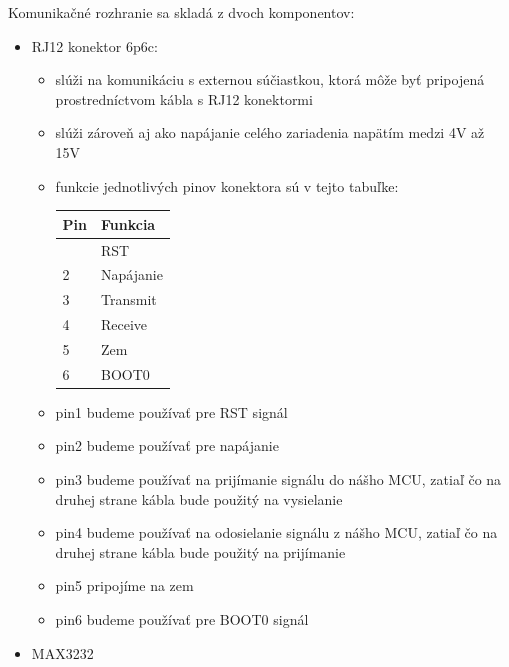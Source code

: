 \documentclass[12pt, twoside]{book}
\begin{document}
Komunikačné rozhranie sa skladá z dvoch komponentov:
\begin{itemize}
\item 
  RJ12 konektor 6p6c:
  \begin{itemize}
   \item 
  slúži na komunikáciu s externou súčiastkou, ktorá môže byť pripojená prostredníctvom kábla s RJ12 konektormi
  \item 
  slúži zároveň aj ako napájanie celého zariadenia napätím medzi 4V až 15V
  \item 
  funkcie jednotlivých pinov konektora sú v tejto tabuľke:

\begin{longtable}[]{@{}ll@{}}
  \toprule\noalign{}
  Pin & Funkcia\\
  \midrule\noalign{}
  \endhead
  \bottomrule\noalign{}
  \endlastfoot
  1 & RST \\  
  2 & Napájanie\\
  3 & Transmit \\
  4 & Receive \\
  5 & Zem \\
  6 & BOOT0\\
  \end{longtable}

\item
  pin1 budeme používať pre RST signál
\item
  pin2 budeme používať pre napájanie
\item
  pin3 budeme používať na prijímanie signálu do nášho MCU, zatiaľ čo na druhej strane kábla bude použitý na vysielanie
\item
  pin4 budeme používať na odosielanie signálu z nášho MCU, zatiaľ čo na druhej strane kábla bude použitý na prijímanie
\item
  pin5 pripojíme na zem
\item
  pin6 budeme používať pre BOOT0 signál
  \end{itemize}
  \item 
  MAX3232


\end{itemize}
\end{document}

